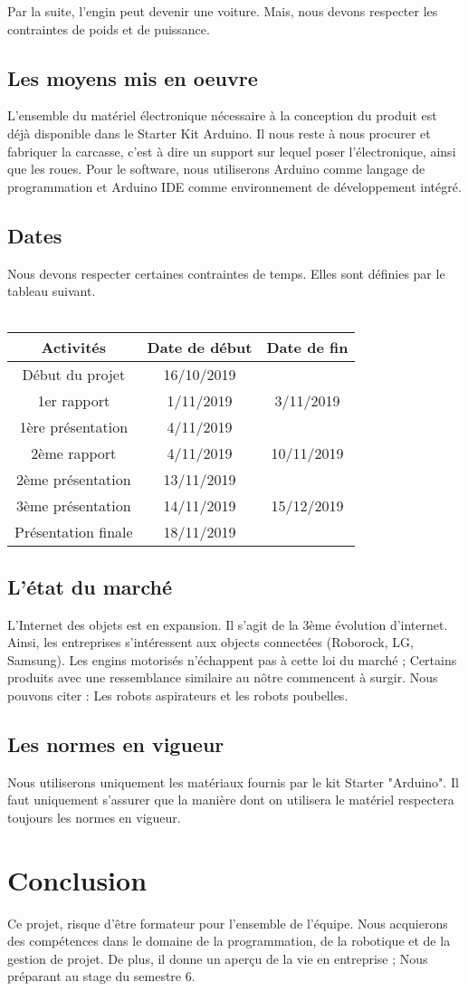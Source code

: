 \documentclass[conference]{IEEEtran}
\begin{document}
Par la suite, l'engin peut devenir une voiture. Mais, nous devons respecter les contraintes de poids et de puissance.
\subsection{Les moyens mis en oeuvre}
L'ensemble du matériel électronique nécessaire à la conception du produit est déjà disponible dans le Starter Kit Arduino. Il nous reste à nous procurer et fabriquer la carcasse, c'est à dire un support sur lequel poser l'électronique, ainsi que les roues. Pour le software, nous utiliserons Arduino comme langage de programmation et Arduino IDE comme environnement de développement intégré.

\subsection{Dates}
Nous devons respecter certaines contraintes de temps. Elles sont définies par le tableau suivant.
\\ \\
\begin{tabular}{|*{3}{c|}}
  \hline
  Activités & Date de début & Date de fin \\
  \hline
  Début du projet & 16/10/2019 &  \\
  1er rapport & 1/11/2019 & 3/11/2019 \\
  1ère présentation & 4/11/2019 &   \\
  2ème rapport & 4/11/2019 & 10/11/2019  \\
  2ème présentation & 13/11/2019 &   \\
  3ème présentation & 14/11/2019 & 15/12/2019  \\
  Présentation finale & 18/11/2019 &  \\
  \hline
\end{tabular}

\subsection{L'état du marché}
L'Internet des objets est en expansion. Il s'agit de la 3ème évolution d'internet. Ainsi, les entreprises s'intéressent aux objects connectées (Roborock, LG, Samsung). Les engins motorisés n'échappent pas à cette loi du marché ; Certains produits avec une ressemblance similaire au nôtre commencent à surgir. Nous pouvons citer : Les robots aspirateurs et les robots poubelles. 

\subsection{Les normes en vigueur}
Nous utiliserons uniquement les matériaux fournis par le kit Starter "Arduino". Il faut uniquement s'assurer que la manière dont on utilisera le matériel respectera toujours les normes en vigueur.

\section{Conclusion}
Ce projet, risque d'être formateur pour l'ensemble de l'équipe. Nous acquierons des compétences dans le domaine de la programmation, de la robotique et de la gestion de projet. De plus, il donne un aperçu de la vie en entreprise ; Nous préparant au stage du semestre 6.\\
\end{document}
